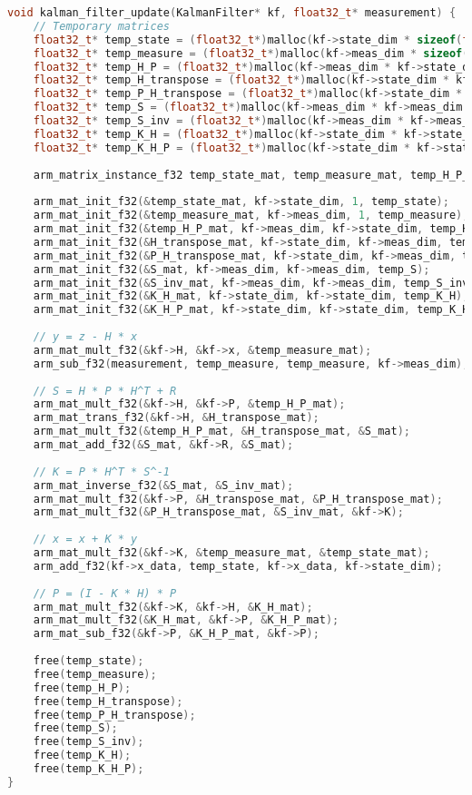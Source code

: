 \documentclass[12pt,a4paper]{report}
\begin{document}
\begin{lstlisting}[language=C++]
void kalman_filter_update(KalmanFilter* kf, float32_t* measurement) {
	// Temporary matrices
	float32_t* temp_state = (float32_t*)malloc(kf->state_dim * sizeof(float32_t));
	float32_t* temp_measure = (float32_t*)malloc(kf->meas_dim * sizeof(float32_t));
	float32_t* temp_H_P = (float32_t*)malloc(kf->meas_dim * kf->state_dim * sizeof(float32_t));
	float32_t* temp_H_transpose = (float32_t*)malloc(kf->state_dim * kf->meas_dim * sizeof(float32_t));
	float32_t* temp_P_H_transpose = (float32_t*)malloc(kf->state_dim * kf->meas_dim * sizeof(float32_t));
	float32_t* temp_S = (float32_t*)malloc(kf->meas_dim * kf->meas_dim * sizeof(float32_t));
	float32_t* temp_S_inv = (float32_t*)malloc(kf->meas_dim * kf->meas_dim * sizeof(float32_t));
	float32_t* temp_K_H = (float32_t*)malloc(kf->state_dim * kf->state_dim * sizeof(float32_t));
	float32_t* temp_K_H_P = (float32_t*)malloc(kf->state_dim * kf->state_dim * sizeof(float32_t));
	
	arm_matrix_instance_f32 temp_state_mat, temp_measure_mat, temp_H_P_mat, H_transpose_mat, P_H_transpose_mat, S_mat, S_inv_mat, K_H_mat, K_H_P_mat;
	
	arm_mat_init_f32(&temp_state_mat, kf->state_dim, 1, temp_state);
	arm_mat_init_f32(&temp_measure_mat, kf->meas_dim, 1, temp_measure);
	arm_mat_init_f32(&temp_H_P_mat, kf->meas_dim, kf->state_dim, temp_H_P);
	arm_mat_init_f32(&H_transpose_mat, kf->state_dim, kf->meas_dim, temp_H_transpose);
	arm_mat_init_f32(&P_H_transpose_mat, kf->state_dim, kf->meas_dim, temp_P_H_transpose);
	arm_mat_init_f32(&S_mat, kf->meas_dim, kf->meas_dim, temp_S);
	arm_mat_init_f32(&S_inv_mat, kf->meas_dim, kf->meas_dim, temp_S_inv);
	arm_mat_init_f32(&K_H_mat, kf->state_dim, kf->state_dim, temp_K_H);
	arm_mat_init_f32(&K_H_P_mat, kf->state_dim, kf->state_dim, temp_K_H_P);
	
	// y = z - H * x
	arm_mat_mult_f32(&kf->H, &kf->x, &temp_measure_mat);
	arm_sub_f32(measurement, temp_measure, temp_measure, kf->meas_dim);
	
	// S = H * P * H^T + R
	arm_mat_mult_f32(&kf->H, &kf->P, &temp_H_P_mat);
	arm_mat_trans_f32(&kf->H, &H_transpose_mat);
	arm_mat_mult_f32(&temp_H_P_mat, &H_transpose_mat, &S_mat);
	arm_mat_add_f32(&S_mat, &kf->R, &S_mat);
	
	// K = P * H^T * S^-1
	arm_mat_inverse_f32(&S_mat, &S_inv_mat);
	arm_mat_mult_f32(&kf->P, &H_transpose_mat, &P_H_transpose_mat);
	arm_mat_mult_f32(&P_H_transpose_mat, &S_inv_mat, &kf->K);
	
	// x = x + K * y
	arm_mat_mult_f32(&kf->K, &temp_measure_mat, &temp_state_mat);
	arm_add_f32(kf->x_data, temp_state, kf->x_data, kf->state_dim);
	
	// P = (I - K * H) * P
	arm_mat_mult_f32(&kf->K, &kf->H, &K_H_mat);
	arm_mat_mult_f32(&K_H_mat, &kf->P, &K_H_P_mat);
	arm_mat_sub_f32(&kf->P, &K_H_P_mat, &kf->P);
	
	free(temp_state);
	free(temp_measure);
	free(temp_H_P);
	free(temp_H_transpose);
	free(temp_P_H_transpose);
	free(temp_S);
	free(temp_S_inv);
	free(temp_K_H);
	free(temp_K_H_P);
}
\end{lstlisting}
\end{document}
